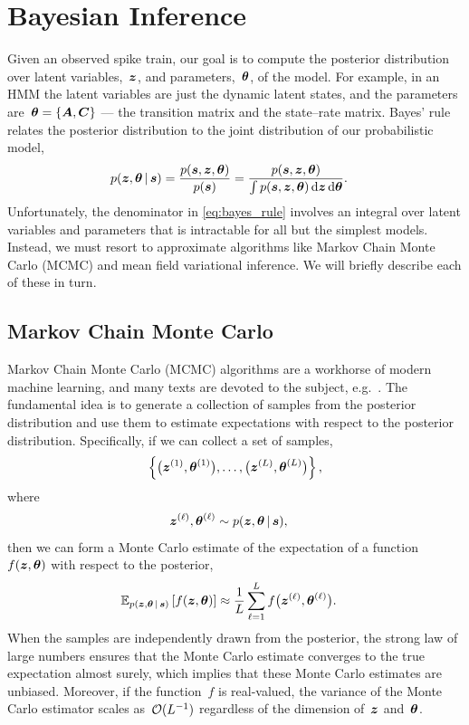 \section{Bayesian Inference}
Given an observed spike train, our goal is to compute the posterior
distribution over latent variables,~$\boldsymbol{z}$, and parameters,~$\boldsymbol{\theta}$,
of the model.  For example, in an HMM the latent variables are just
the dynamic latent states, and the parameters
are~${\boldsymbol{\theta} = \{\boldsymbol{A}, \boldsymbol{C}\}}$ --- the transition matrix and the
state--rate matrix. Bayes' rule relates the posterior distribution to
the joint distribution of our probabilistic model,
\begin{align}
  \label{eq:bayes_rule}
  p(\boldsymbol{z}, \boldsymbol{\theta} \,|\, \boldsymbol{s}) 
  &= \frac{p(\boldsymbol{s}, \boldsymbol{z}, \boldsymbol{\theta})}{p(\boldsymbol{s})} 
   = \frac{p(\boldsymbol{s}, \boldsymbol{z}, \boldsymbol{\theta})}{\int p(\boldsymbol{s}, \boldsymbol{z}, \boldsymbol{\theta}) \, \mathrm{d}\boldsymbol{z} \, \mathrm{d}\boldsymbol{\theta}} .
\end{align}
Unfortunately, the denominator in \eqref{eq:bayes_rule} involves an 
integral over latent variables and parameters that is intractable for 
all but the simplest models. Instead, we must resort to approximate 
algorithms like Markov Chain Monte Carlo (MCMC) and mean field variational 
inference. We will briefly describe each of these in turn.

\subsection{Markov Chain Monte Carlo}
Markov Chain Monte Carlo (MCMC) algorithms are a workhorse of modern
machine learning, and many texts are devoted to the subject,
e.g.~\cite{geyer1992practical, gilks2005markov, robert2013monte}.  The
fundamental idea is to generate a collection of samples from the
posterior distribution and use them to estimate expectations with
respect to the posterior distribution.  Specifically, if we can collect a set of
samples,
\begin{align}
  \left \{ \big(\boldsymbol{z}^{(1)}, \boldsymbol{\theta}^{(1)} \big), 
           \ldots, 
           \big(\boldsymbol{z}^{(L)}, \boldsymbol{\theta}^{(L)} \big) 
  \right\},
\end{align}
where
\begin{align}
  \boldsymbol{z}^{(\ell)}, \boldsymbol{\theta}^{(\ell)} &\sim p(\boldsymbol{z}, \boldsymbol{\theta} \,|\, \boldsymbol{s}),
\end{align}
then we can form a Monte Carlo estimate of the expectation of a function~$f(\boldsymbol{z}, \boldsymbol{\theta})$
with respect to the posterior,
\begin{align}
  \mathbb{E}_{p(\boldsymbol{z}, \boldsymbol{\theta} \,|\, \boldsymbol{s})} \left[ f(\boldsymbol{z}, \boldsymbol{\theta}) \right] 
  &\approx \frac{1}{L} \sum_{\ell = 1}^L f \big(\boldsymbol{z}^{(\ell)}, \boldsymbol{\theta}^{(\ell)} \big).
\end{align}
When the samples are independently drawn from the posterior, the strong 
law of large numbers ensures that the Monte Carlo estimate converges to 
the true expectation almost surely, which implies that these Monte Carlo
estimates are unbiased. Moreover, if the function~$f$ is real-valued, 
the variance of the Monte Carlo estimator scales as~$\mathcal{O}(L^{-1})$
regardless of the dimension of~$\boldsymbol{z}$ and~$\boldsymbol{\theta}$.


